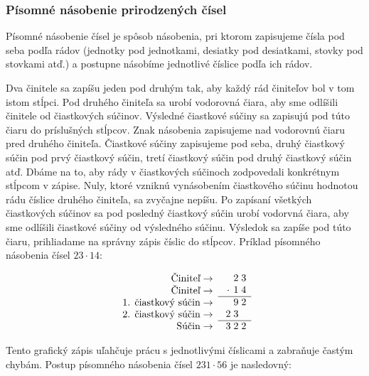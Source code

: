 \documentclass{report}
\begin{document}
\subsubsection{Písomné násobenie prirodzených čísel}

Písomné násobenie čísel je spôsob násobenia, pri ktorom zapisujeme čísla pod seba podľa rádov (jednotky pod jednotkami, desiatky pod desiatkami, stovky pod stovkami atď.) a postupne násobíme jednotlivé číslice podľa ich rádov.

Dva činitele sa zapíšu jeden pod druhým tak, aby každý rád činiteľov bol v tom istom stĺpci. Pod druhého činiteľa sa urobí vodorovná čiara, aby sme odlíšili činitele od čiastkových súčinov. Výsledné čiastkové súčiny sa zapisujú pod túto čiaru do príslušných stĺpcov. Znak násobenia zapisujeme nad vodorovnú čiaru pred druhého činiteľa. Čiastkové súčiny zapisujeme pod seba, druhý čiastkový súčin pod prvý čiastkový súčin, tretí čiastkový súčin pod druhý čiastkový súčin atď. Dbáme na to, aby rády v čiastkových súčinoch zodpovedali konkrétnym stĺpcom v zápise. Nuly, ktoré vzniknú vynásobením čiastkového súčinu hodnotou rádu číslice druhého činiteľa, sa zvyčajne nepíšu. Po zapísaní všetkých čiastkových súčinov sa pod posledný čiastkový súčin urobí vodorvná čiara, aby sme odlíšili čiastkové súčiny od výsledného súčinu. Výsledok sa zapíše pod túto čiaru, prihliadame na správny zápis číslic do stĺpcov. Príklad písomného násobenia čísel \(23 \cdot 14\):
\begin{table}[H]
  \centering
  \[
  \begin{array}{r}
    \text{Činiteľ} \rightarrow \\
    \text{Činiteľ} \rightarrow \\
    \text{1. čiastkový súčin} \rightarrow \\
    \text{2. čiastkový súčin} \rightarrow \\
    \text{Súčin} \rightarrow \\
  \end{array}
  \begin{array}{c@{\;}c@{\;}c@{\;}c}
    &   & 2 & 3 \\
    & \cdot  & 1 & 4 \\
    \hline
    &   & 9 & 2 \\
    & 2 & 3 &   \\
    \hline
    & 3 & 2 & 2
  \end{array}
  \]
\end{table}

Tento grafický zápis uľahčuje prácu s jednotlivými číslicami a zabraňuje častým chybám. Postup písomného násobenia čísel \(231 \cdot 56\) je nasledovný:
\end{document}
